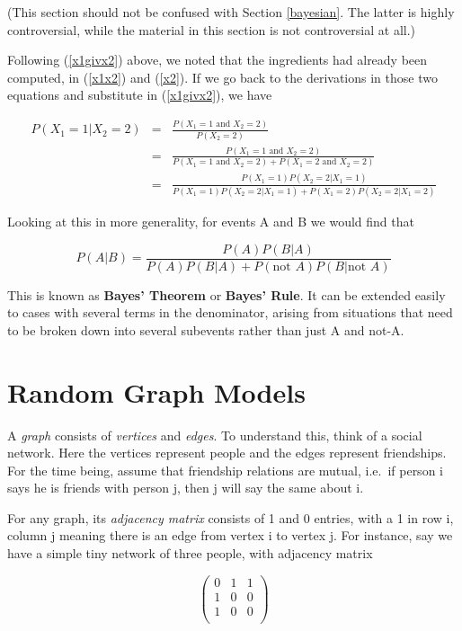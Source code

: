(This section should not be confused with Section \ref{bayesian}.  The
latter is highly controversial, while the material in this section is
not controversial at all.)

Following (\ref{x1givx2}) above, we noted that the ingredients had
already been computed, in (\ref{x1x2}) and (\ref{x2}).  If we go back
to the derivations in those two equations and substitute in
(\ref{x1givx2}), we have

\begin{eqnarray}
P(X_1 = 1 | X_2 = 2) &=& 
\frac
{P(X_1 = 1 \textrm{ and } X_2 = 2)}
{P(X_2 = 2)} \\
&=& \frac
{P(X_1 = 1 \textrm{ and } X_2 = 2)}
{P(X_1 = 1 \textrm{ and } X_2 = 2) + P(X_1 = 2 \textrm{ and } X_2 = 2)} \\
&=& \frac
{P(X_1 = 1) P(X_2 = 2 | X_1 = 1)}
{P(X_1 = 1) P(X_2 = 2 | X_1 = 1) + P(X_1 = 2) P(X_2 = 2 | X_1 = 2)} 
\end{eqnarray}

Looking at this in more generality, for events A and B we would find
that

\begin{equation}
\label{thisisbayes}
P(A|B) = \frac{P(A) P(B|A)}{P(A) P(B|A) + P(\textrm{not }A)
P(B|\textrm{not } A)}
\end{equation}

This is known as {\bf Bayes' Theorem} or {\bf Bayes' Rule}.  It can be
extended easily to cases with several terms in the denominator, arising
from situations that need to be broken down into several subevents
rather than just A and not-A.

\section{Random Graph Models}
\label{randomgraph}
A {\it graph} consists of {\it vertices} and {\it edges}.  To understand
this, think of a social network.  Here the vertices represent people and
the edges represent friendships.  For the time being, assume that
friendship relations are mutual, i.e.\ if person i says he is friends
with person j, then j will say the same about i.

For any graph, its {\it adjacency matrix} consists of 1 and 0 entries,
with a 1 in row i, column j meaning there is an edge from vertex i to
vertex j.  For instance, say we have a simple tiny network of three
people, with adjacency matrix

\begin{equation}
\label{graphex}
\left (
\begin{array}{rrr}
0 & 1 & 1 \\
1 & 0 & 0 \\
1 & 0 & 0 \\
\end{array}
\right )
\end{equation}

